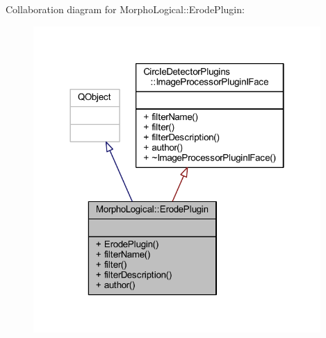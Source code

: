 Collaboration diagram for Morpho\+Logical\+:\+:Erode\+Plugin\+:\nopagebreak
\begin{figure}[H]
\begin{center}
\leavevmode
\includegraphics[width=310pt]{d3/d05/class_morpho_logical_1_1_erode_plugin__coll__graph}
\end{center}
\end{figure}
